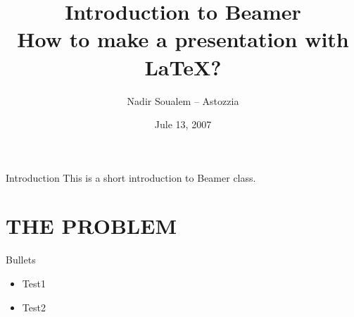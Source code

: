 \documentclass{beamer}
\title[Make a LaTeX presentation using Beamer]{Introduction  to Beamer\\How to make a presentation with LaTeX?}
\author{Nadir Soualem -- Astozzia}
\institute{Math-linux.com}
\date{Jule 13, 2007}
\begin{document}
\begin{omeframe}
\titlepage
\end{omeframe}


\begin{omeframe}{Introduction}
This is a short introduction to Beamer class.
\end{omeframe}

\section{THE PROBLEM}
\omesectionpage

\begin{glencoeframe}{Bullets}
    \begin{itemize}
        \item Test1
        \item Test2
    \end{itemize}
\end{glencoeframe}
\end{document}
